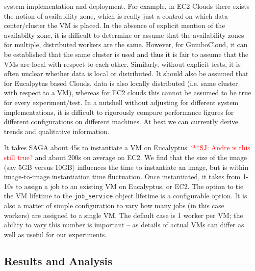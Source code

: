 \documentclass[conference,final]{IEEEtran}
\newcommand{\jhanote}[1]{ {\textcolor{red} { ***SJ: #1 }}}
\newcommand{\jhanote}[1]{}
\begin{document}
system implementation and deployment.  For example, in EC2 Clouds %
there exists the notion of availability zone, which is really just a
control on which data-center/cluster the VM is placed. In the absence
of explicit mention of the availabilty zone, it is difficult to
determine or assume that the availability zones for multiple,
distributed workers are the same. However, for GumboCloud, it can be
established that the same cluster is used and thus it is fair to
assume that the VMs are local with respect to each other.  Similarly,
without explicit tests, it is often unclear whether data is local or
distributed.  It should also be assumed that for Eucalpytus based
Clouds, data is also locally distributed (i.e.  same cluster with
respect to a VM), whereas for EC2 clouds this cannot be assumed to be
true for every experiment/test. In a nutshell without adjusting for
different system implementations, it is difficult to rigorously
compare performance figures for different configurations on different
machines. At best we can currently derive trends and qualitative
information.

It takes SAGA about 45s to instantiate a VM on Eucalyptus
\jhanote{Andre is this still true?}  and about 200s on average on EC2.
We find that the size of the image (say 5GB versus 10GB) influences
the time to instantiate an image, but is within image-to-image
instantiation time fluctuation.  Once instantiated, it takes from
1-10s to assign a job to an existing VM on Eucalyptus, or EC2.  The
option to tie the VM lifetime to the \texttt{job\_service} object
lifetime is a configurable option.  It is also a matter of simple
configuration to vary how many jobs (in this case workers) are
assigned to a single VM. The default case is 1 worker per VM; the
ability to vary this number is important -- as details of actual VMs
can differ as well as useful for our experiments.

\subsection{Results and Analysis}
\end{document}

